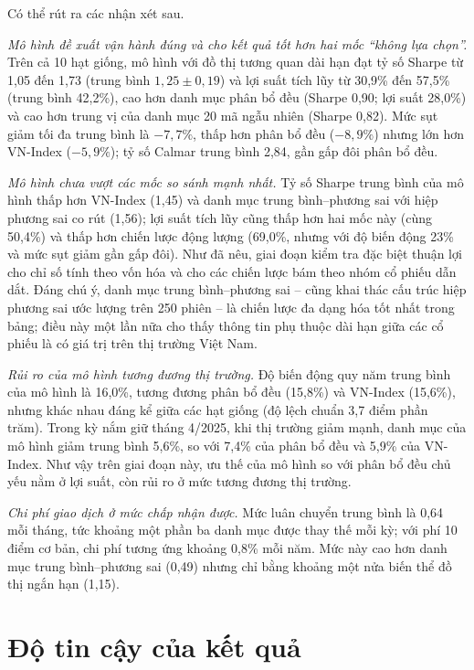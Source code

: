 Có thể rút ra các nhận xét sau.

\textit{Mô hình đề xuất vận hành đúng và cho kết quả tốt hơn hai mốc ``không lựa chọn''.} Trên cả 10 hạt giống, mô hình với đồ thị tương quan dài hạn đạt tỷ số Sharpe từ 1,05 đến 1,73 (trung bình $1{,}25\pm0{,}19$) và lợi suất tích lũy từ 30,9\% đến 57,5\% (trung bình 42,2\%), cao hơn danh mục phân bổ đều (Sharpe 0,90; lợi suất 28,0\%) và cao hơn trung vị của danh mục 20 mã ngẫu nhiên (Sharpe 0,82). Mức sụt giảm tối đa trung bình là $-7{,}7\%$, thấp hơn phân bổ đều ($-8{,}9\%$) nhưng lớn hơn VN-Index ($-5{,}9\%$); tỷ số Calmar trung bình 2,84, gần gấp đôi phân bổ đều.

\textit{Mô hình chưa vượt các mốc so sánh mạnh nhất.} Tỷ số Sharpe trung bình của mô hình thấp hơn VN-Index (1,45) và danh mục trung bình--phương sai với hiệp phương sai co rút (1,56); lợi suất tích lũy cũng thấp hơn hai mốc này (cùng 50,4\%) và thấp hơn chiến lược động lượng (69,0\%, nhưng với độ biến động 23\% và mức sụt giảm gần gấp đôi). Như đã nêu, giai đoạn kiểm tra đặc biệt thuận lợi cho chỉ số tính theo vốn hóa và cho các chiến lược bám theo nhóm cổ phiếu dẫn dắt. Đáng chú ý, danh mục trung bình--phương sai -- cũng khai thác cấu trúc hiệp phương sai ước lượng trên 250 phiên -- là chiến lược đa dạng hóa tốt nhất trong bảng; điều này một lần nữa cho thấy thông tin phụ thuộc dài hạn giữa các cổ phiếu là có giá trị trên thị trường Việt Nam.

\textit{Rủi ro của mô hình tương đương thị trường.} Độ biến động quy năm trung bình của mô hình là 16,0\%, tương đương phân bổ đều (15,8\%) và VN-Index (15,6\%), nhưng khác nhau đáng kể giữa các hạt giống (độ lệch chuẩn 3,7 điểm phần trăm). Trong kỳ nắm giữ tháng 4/2025, khi thị trường giảm mạnh, danh mục của mô hình giảm trung bình 5,6\%, so với 7,4\% của phân bổ đều và 5,9\% của VN-Index. Như vậy trên giai đoạn này, ưu thế của mô hình so với phân bổ đều chủ yếu nằm ở lợi suất, còn rủi ro ở mức tương đương thị trường.

\textit{Chi phí giao dịch ở mức chấp nhận được.} Mức luân chuyển trung bình là 0,64 mỗi tháng, tức khoảng một phần ba danh mục được thay thế mỗi kỳ; với phí 10 điểm cơ bản, chi phí tương ứng khoảng 0,8\% mỗi năm. Mức này cao hơn danh mục trung bình--phương sai (0,49) nhưng chỉ bằng khoảng một nửa biến thể đồ thị ngắn hạn (1,15).

\section{Độ tin cậy của kết quả}
\label{sec:reliability}

